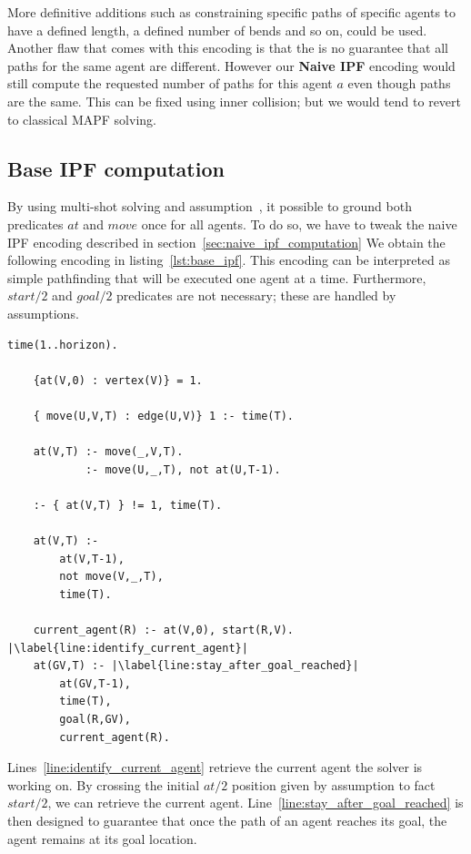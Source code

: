 More definitive additions such as constraining specific paths of specific agents to have a defined length, a defined number of bends and so on, could be used.
Another flaw that comes with this encoding is that the is no guarantee that all paths for the same agent are different. However our \textbf{Naive IPF} encoding would still compute the requested number of paths for this agent \(a\) even though paths are the same. This can be fixed using inner collision; but we would tend to revert to classical MAPF solving.

\subsection{Base IPF computation}\label{sec:base_ipf_computation}

By using multi-shot solving and assumption~\cite{karoscwa21a}, it  possible to ground both predicates \(at\) and \(move\) once for all agents. To do so, we have to tweak the naive IPF encoding described in section~\ref{sec:naive_ipf_computation} We obtain the following encoding in listing~\ref{lst:base_ipf}. This encoding can be interpreted as simple pathfinding that will be executed one agent at a time. Furthermore, \(start/2\) and \(goal/2\) predicates are not necessary; these are handled by assumptions.


\begin{minipage}[H]{\linewidth}
\begin{lstlisting}[style=mystyle, caption={Base IPF computation}, label={lst:base_ipf}]
    time(1..horizon).

    {at(V,0) : vertex(V)} = 1.

    { move(U,V,T) : edge(U,V)} 1 :- time(T).

    at(V,T) :- move(_,V,T).
            :- move(U,_,T), not at(U,T-1).

    :- { at(V,T) } != 1, time(T).

    at(V,T) :- 
        at(V,T-1), 
        not move(V,_,T), 
        time(T).

    current_agent(R) :- at(V,0), start(R,V). |\label{line:identify_current_agent}|
    at(GV,T) :- |\label{line:stay_after_goal_reached}|
        at(GV,T-1), 
        time(T), 
        goal(R,GV), 
        current_agent(R). 
\end{lstlisting}
\end{minipage}

Lines~\ref{line:identify_current_agent} retrieve the current agent the solver is working on. By crossing the initial \(at/2\) position given by assumption to fact \(start/2\), we can retrieve the current agent. Line~\ref{line:stay_after_goal_reached} is then designed to guarantee that once the path of an agent reaches its goal, the agent remains at its goal location.



